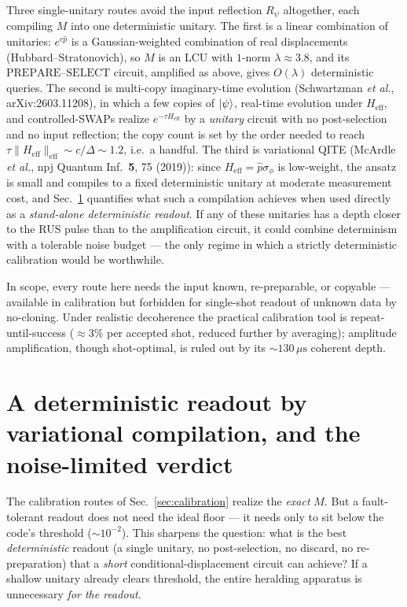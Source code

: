 \documentclass[11pt]{article}
\begin{document}
Three single-unitary routes avoid the input reflection $R_\psi$ altogether, each compiling $M$ into
one deterministic unitary. The first is a linear combination of unitaries: $e^{c\hat p}$ is a
Gaussian-weighted combination of real displacements (Hubbard--Stratonovich), so $M$ is an LCU with
$1$-norm $\lambda\approx3.8$, and its $\mathrm{PREPARE}$--$\mathrm{SELECT}$ circuit, amplified as above,
gives $O(\lambda)$ deterministic queries. The second is multi-copy imaginary-time evolution
(Schwartzman \emph{et al.}, arXiv:2603.11208), in which a few copies of $\ket\psi$, real-time
evolution under $H_{\mathrm{eff}}$, and controlled-SWAPs realize $e^{-\tau H_{\mathrm{eff}}}$ by a
\emph{unitary} circuit with no post-selection and no input reflection; the copy count is set by the
order needed to reach $\tau\|H_{\mathrm{eff}}\|_{\mathrm{eff}}\sim c/\Delta\sim1.2$, i.e.\ a handful.
The third is variational QITE (McArdle \emph{et al.}, npj Quantum Inf.\ \textbf{5}, 75 (2019)): since
$H_{\mathrm{eff}}=\hat p\sigma_\phi$ is low-weight, the ansatz is small and compiles to a fixed
deterministic unitary at moderate measurement cost, and Sec.~\ref{sec:qite-readout} quantifies what
such a compilation achieves when used directly as a \emph{stand-alone deterministic readout}. If any of
these unitaries has a depth closer to the RUS pulse than to the amplification circuit, it could combine
determinism with a tolerable noise budget --- the only regime in which a strictly deterministic
calibration would be worthwhile.

In scope, every route here needs the input known, re-preparable, or copyable --- available in
calibration but forbidden for single-shot readout of unknown data by no-cloning. Under realistic
decoherence the practical calibration tool is repeat-until-success ($\approx3\%$ per accepted shot,
reduced further by averaging); amplitude amplification, though shot-optimal, is ruled out by its
$\sim\!130\,\mu\mathrm{s}$ coherent depth.

\section{A deterministic readout by variational compilation, and the noise-limited verdict}
\label{sec:qite-readout}
The calibration routes of Sec.~\ref{sec:calibration} realize the \emph{exact} $M$. But a
fault-tolerant readout does not need the ideal floor --- it needs only to sit below the code's
threshold ($\sim\!10^{-2}$). This sharpens the question: what is the best \emph{deterministic}
readout (a single unitary, no post-selection, no discard, no re-preparation) that a \emph{short}
conditional-displacement circuit can achieve? If a shallow unitary already clears threshold, the
entire heralding apparatus is unnecessary \emph{for the readout}.
\end{document}
